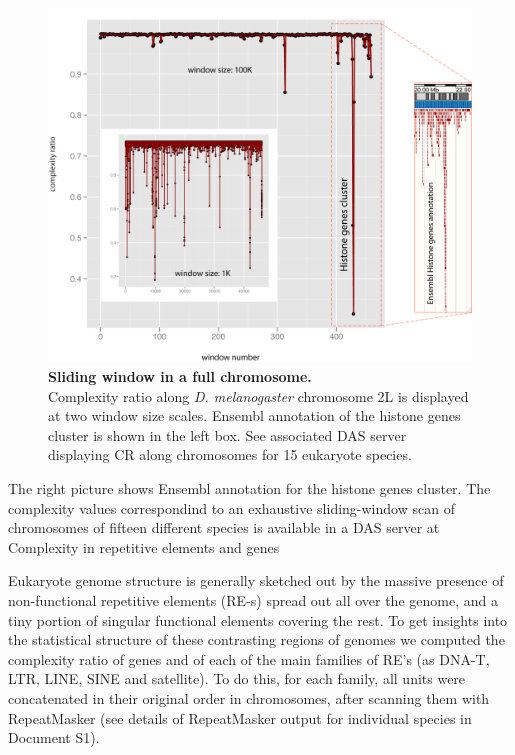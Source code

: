 \begin{figure}[htpb] 
\centering 
\includegraphics[width=\textwidth]{tex_source/figures/dna_struct/windows_2L.png}
\caption[Sliding window in a full chromosome]{{\bf Sliding window in a full chromosome.} \\Complexity ratio along \textit{D. melanogaster} chromosome 2L is displayed at two window size scales. Ensembl annotation of the histone genes cluster is shown in the left box. See associated DAS server displaying CR along chromosomes for 15 eukaryote species.
}
\label{fig:win_2L}
\end{figure}


The right picture shows Ensembl annotation for the histone genes cluster. The complexity values correspondind to an exhaustive sliding-window scan of chromosomes of fifteen different species is available in a DAS server at  Complexity in repetitive elements and genes 

Eukaryote genome structure is generally sketched out by the massive presence of non-functional repetitive elements (RE-s) spread out all over the genome, and a tiny portion of singular functional elements covering the rest. To get insights into the statistical structure of these contrasting regions of genomes we computed the complexity ratio of genes and of each of the main families of RE's (as DNA-T, LTR, LINE, SINE and satellite). To do this, for each family, all units were concatenated in their original order in chromosomes, after scanning them with RepeatMasker  \cite{Smit2010} (see details of RepeatMasker output for individual species in Document S1).

